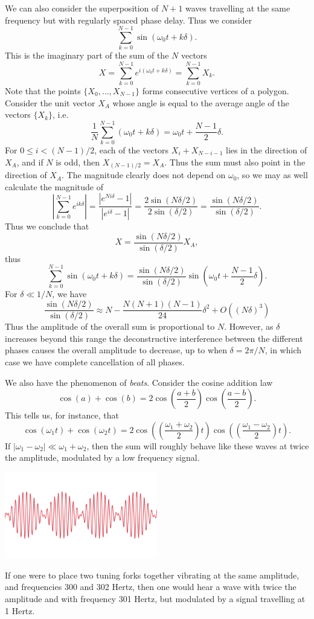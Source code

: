 We can also consider the superposition of $N+1$ waves travelling at the same frequency but with regularly spaced phase delay. Thus we consider
%
\[ \sum_{k = 0}^{N-1} \sin(\omega_0 t + k \delta). \]
%
This is the imaginary part of the sum of the $N$ vectors
%
\[ X = \sum_{k = 0}^{N-1} e^{i (\omega_0 t + k \delta)} = \sum_{k = 0}^{N-1} X_k. \]
%
Note that the points $\{ X_0, \dots, X_{N-1} \}$ forms consecutive vertices of a polygon. Consider the unit vector $X_A$ whose angle is equal to the average angle of the vectors $\{ X_k \}$, i.e.
%
\[ \frac{1}{N} \sum_{k = 0}^{N-1} (\omega_0 t + k \delta) = \omega_0 t + \frac{N-1}{2} \delta. \]
%
For $0 \leq i < (N-1)/2$, each of the vectors $X_i + X_{N-i-1}$ lies in the direction of $X_A$, and if $N$ is odd, then $X_{(N-1)/2} = X_A$. Thus the sum must also point in the direction of $X_A$. The magnitude clearly does not depend on $\omega_0$, so we may as well calculate the magnitude of
%
\[ \left| \sum_{k = 0}^{N-1} e^{i k \delta} \right| = \frac{|e^{N i \delta} - 1|}{|e^{i \delta} - 1|} = \frac{2 \sin(N \delta /2)}{2 \sin(\delta / 2)} = \frac{\sin(N\delta/2)}{\sin(\delta/2)}. \]
%
Thus we conclude that
%
\[ X = \frac{\sin(N\delta/2)}{\sin(\delta/2)} X_A, \]
%
thus
%
\[ \sum_{k = 0}^{N-1} \sin(\omega_0 t + k \delta) = \frac{\sin(N\delta/2)}{\sin(\delta/2)} \sin \left( \omega_0 t + \frac{N-1}{2} \delta \right). \]
%
For $\delta \ll 1/N$, we have
%
\[ \frac{\sin(N \delta/2)}{\sin(\delta/2)} \approx N - \frac{N (N + 1)(N - 1)}{24} \delta^2 + O( (N \delta)^3 ) \]
%
Thus the amplitude of the overall sum is proportional to $N$. However, as $\delta$ increases beyond this range the deconstructive interference between the different phases causes the overall amplitude to decrease, up to when $\delta = 2\pi / N$, in which case we have complete cancellation of all phases.

We also have the phenomenon of \emph{beats}. Consider the cosine addition law
%
\[ \cos(a) + \cos(b) = 2 \cos \left( \frac{a + b}{2} \right) \cos \left( \frac{a - b}{2} \right). \]
%
This tells us, for instance, that
%
\[ \cos(\omega_1 t) + \cos(\omega_2 t) = 2 \cos \left( \left( \frac{\omega_1 + \omega_2}{2} \right) t \right) \cos \left( \left( \frac{\omega_1 - \omega_2}{2} \right) t \right). \]
%
If $|\omega_1 - \omega_2| \ll \omega_1 + \omega_2$, then the sum will roughly behave like these waves at twice the amplitude, modulated by a low frequency signal.
%
\begin{center}
\includegraphics[width=0.5\textwidth]{beats.png}
\end{center}
%
If one were to place two tuning forks together vibrating at the same amplitude, and frequencies 300 and 302 Hertz, then one would hear a wave with twice the amplitude and with frequency 301 Hertz, but modulated by a signal travelling at 1 Hertz.

